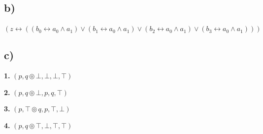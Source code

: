 \documentclass{article} %
\begin{document}
\subsection*{\hspace{1cm}b)}
\begin{flushleft}
\hspace{2cm}$(z\leftrightarrow ((b_0 \leftrightarrow a_0 \land a_1) \lor (b_1 \leftrightarrow a_0 \land a_1) \lor (b_2 \leftrightarrow a_0 \land a_1) \lor (b_3 \leftrightarrow a_0 \land a_1)))$
\end{flushleft}

\subsection*{\hspace{1cm}c)}
\begin{flushleft}
\hspace{2cm}\textbf{1.} $(p,q \circledcirc \bot,\bot,\bot,\top )$

\hspace{2cm}\textbf{2.} $(p,q \circledcirc \bot,p,q,\top )$

\hspace{2cm}\textbf{3.} $(p,\top \circledcirc q,p,\top,\bot )$

\hspace{2cm}\textbf{4.} $(p,q \circledcirc \top,\bot,\top,\top )$

\end{flushleft}
\end{document}
